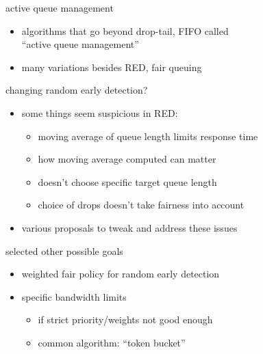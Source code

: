 \begin{frame}{active queue management}
    \begin{itemize}
    \item algorithms that go beyond drop-tail, FIFO called \\
        ``active queue management''
    \vspace{.5cm}
    \item many variations besides RED, fair queuing
    \end{itemize}
\end{frame}

\begin{frame}{changing random early detection?}
    \begin{itemize}
    \item some things seem suspicious in RED:
        \begin{itemize}
        \item moving average of queue length limits response time
        \item how moving average computed can matter
        \item doesn't choose specific target queue length
        \item choice of drops doesn't take fairness into account
        \end{itemize}
    \item various proposals to tweak and address these issues
    \end{itemize}
\end{frame}

\begin{frame}{selected other possible goals}
    \begin{itemize}
    \item weighted fair policy for random early detection
    \item specific bandwidth limits
        \begin{itemize}
        \item if strict priority/weights not good enough
        \item common algorithm: ``token bucket''
        \end{itemize}
    \end{itemize}
\end{frame}
